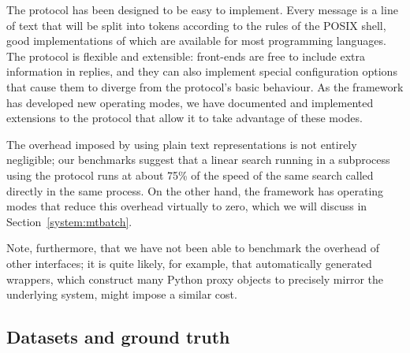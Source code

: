 
The protocol has been designed to be easy to implement. Every message is a line
of text that will be split into tokens according to the rules of the POSIX
shell, good implementations of which are available for most programming
languages.
The protocol is flexible and extensible: front-ends are free to
include extra information in replies, and they can also implement special
configuration options that cause them to diverge from the protocol's basic
behaviour. As the framework has developed new operating modes, we have
documented and implemented extensions to the protocol that allow it to take
advantage of these modes.

The overhead imposed by using plain text representations is not entirely
negligible; our benchmarks suggest that a linear search running in a subprocess
using the protocol runs at about 75\% of the speed of the same search called
directly in the same process. On the other hand, the framework has operating
modes that
reduce this overhead virtually to zero, which we will discuss in
Section~\ref{system:mtbatch}.

Note, furthermore, that we have not been able to benchmark the overhead of
other interfaces; it is quite likely, for example, that automatically generated
wrappers, which construct many Python proxy objects to precisely mirror the
underlying system, might impose a similar cost.

\subsection{Datasets and ground truth}

